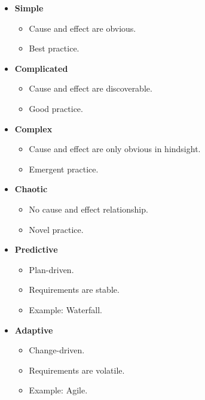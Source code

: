 \documentclass[10pt]{article}
\begin{document}
\begin{multicols}{5}
  \begin{block}
    \begin{itemize}
      \item \textbf{Simple}
      \begin{itemize}
        \item Cause and effect are obvious.
        \item Best practice.
      \end{itemize}
      \item \textbf{Complicated}
      \begin{itemize}
        \item Cause and effect are discoverable.
        \item Good practice.
      \end{itemize}
      \item \textbf{Complex}
      \begin{itemize}
        \item Cause and effect are only obvious in hindsight.
        \item Emergent practice.
      \end{itemize}
      \item \textbf{Chaotic}
      \begin{itemize}
        \item No cause and effect relationship.
        \item Novel practice.
      \end{itemize}
    \end{itemize}
  \end{block}

  \begin{block}
    \begin{itemize}
      \item \textbf{Predictive}
      \begin{itemize}
        \item Plan-driven.
        \item Requirements are stable.
        \item Example: Waterfall.
      \end{itemize}
      \item \textbf{Adaptive}
      \begin{itemize}
        \item Change-driven.
        \item Requirements are volatile.
        \item Example: Agile.
      \end{itemize}
    \end{itemize}
  \end{block}
  

\end{multicols}
\end{document}
